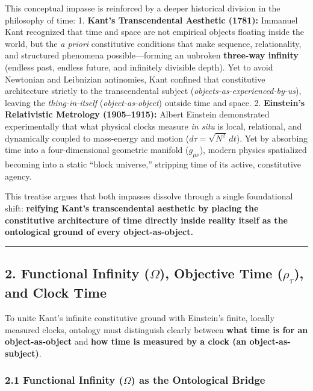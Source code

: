 \documentclass[
]{article}
\begin{document}
This conceptual impasse is reinforced by a deeper historical division in
the philosophy of time: 1. \textbf{Kant's Transcendental Aesthetic
(1781):} Immanuel Kant recognized that time and space are not empirical
objects floating inside the world, but the \emph{a priori} constitutive
conditions that make sequence, relationality, and structured phenomena
possible---forming an unbroken \textbf{three-way infinity} (endless
past, endless future, and infinitely divisible depth). Yet to avoid
Newtonian and Leibnizian antinomies, Kant confined that constitutive
architecture strictly to the transcendental subject
(\emph{objects-as-experienced-by-us}), leaving the
\emph{thing-in-itself} (\emph{object-as-object}) outside time and space.
2. \textbf{Einstein's Relativistic Metrology (1905--1915):} Albert
Einstein demonstrated experimentally that what physical clocks measure
\emph{in situ} is local, relational, and dynamically coupled to
mass-energy and motion (\(d\tau = \sqrt{N^2}\,dt\)). Yet by absorbing
time into a four-dimensional geometric manifold (\(g_{\mu\nu}\)), modern
physics spatialized becoming into a static ``block universe,'' stripping
time of its active, constitutive agency.

This treatise argues that both impasses dissolve through a single
foundational shift: \textbf{reifying Kant's transcendental aesthetic by
placing the constitutive architecture of time directly inside reality
itself as the ontological ground of every object-as-object.}

\begin{center}\rule{0.5\linewidth}{0.5pt}\end{center}

\subsection{\texorpdfstring{2. Functional Infinity (\(\Omega\)),
Objective Time (\(\rho_\tau\)), and Clock
Time}{2. Functional Infinity (\textbackslash Omega), Objective Time (\textbackslash rho\_\textbackslash tau), and Clock Time}}\label{functional-infinity-omega-objective-time-rho_tau-and-clock-time}

To unite Kant's infinite constitutive ground with Einstein's finite,
locally measured clocks, ontology must distinguish clearly between
\textbf{what time is for an object-as-object} and \textbf{how time is
measured by a clock (an object-as-subject)}.

\subsubsection{\texorpdfstring{2.1 Functional Infinity (\(\Omega\)) as
the Ontological
Bridge}{2.1 Functional Infinity (\textbackslash Omega) as the Ontological Bridge}}\label{functional-infinity-omega-as-the-ontological-bridge}
\end{document}
